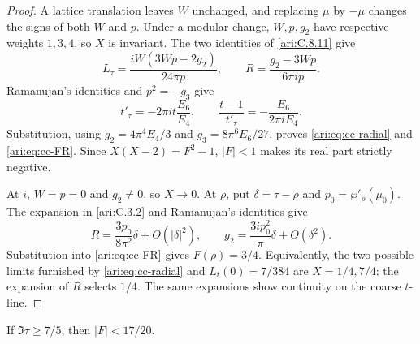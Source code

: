 \begin{proof}
A lattice translation leaves $W$ unchanged, and replacing $\mu$
by $-\mu$ changes the signs of both $W$ and $p$. Under a modular
change, $W,p,g_2$ have respective weights $1,3,4$, so $X$ is
invariant. The two identities of \ref{ari:C.8.11} give
\[
 L_\tau=\frac{iW(3Wp-2g_2)}{24\pi p},\qquad
 R=\frac{g_2-3Wp}{6\pi ip}.
\]
Ramanujan's identities and $p^2=-g_3$ give
\[
 t'_\tau=-2\pi it\frac{E_6}{E_4},\qquad
 \frac{t-1}{t'_\tau}=-\frac{E_6}{2\pi iE_4}.
\]
Substitution, using $g_2=4\pi^4E_4/3$ and
$g_3=8\pi^6E_6/27$, proves \eqref{ari:eq:cc-radial} and
\eqref{ari:eq:cc-FR}. Since $X(X-2)=F^2-1$, $|F|<1$ makes
its real part strictly negative.

At $i$, $W=p=0$ and $g_2\ne0$, so $X\to0$. At $\rho$, put $\delta=\tau-\rho$ and $p_0=\wp'_\rho(\mu_0)$.
The expansion in \ref{ari:C.3.2} and Ramanujan's identities give
\[
 R=\frac{3p_0}{8\pi^2}\delta+O(|\delta|^2),\qquad
 g_2=\frac{3ip_0^2}{\pi}\delta+O(\delta^2).
\]
Substitution into \eqref{ari:eq:cc-FR} gives $F(\rho)=3/4$.
Equivalently, the two possible limits furnished by
\eqref{ari:eq:cc-radial} and $L_t(0)=7/384$ are $X=1/4,7/4$;
the expansion of $R$ selects $1/4$. The same expansions show
continuity on the coarse $t$-line.
\end{proof}

\begin{proposition}\label{ari:C.8.13}
If $\Im\tau\ge7/5$, then $|F|<17/20$.
\end{proposition}


